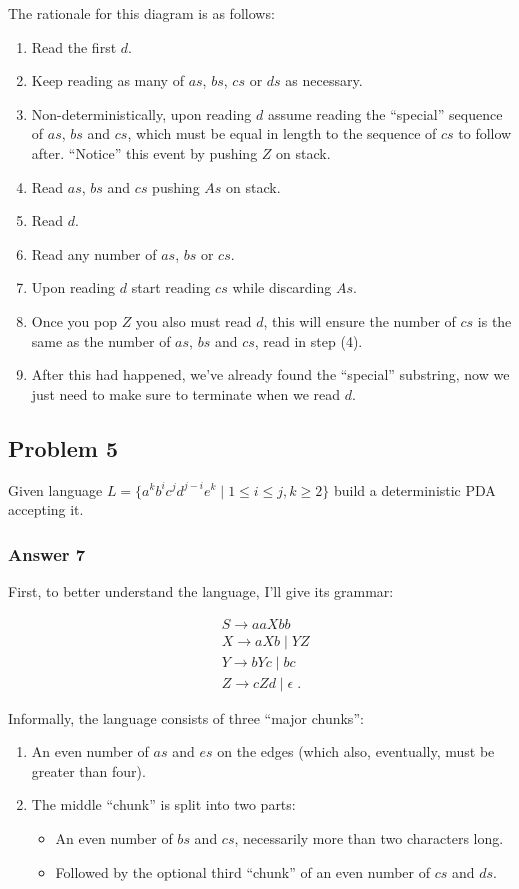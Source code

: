 \documentclass[11pt]{article}
\begin{document}
The rationale for this diagram is as follows:
\begin{enumerate}
\item Read the first $d$.
\item Keep reading as many of $as$, $bs$, $cs$ or $ds$ as necessary.
\item Non-deterministically, upon reading $d$ assume reading the
``special'' sequence of $as$, $bs$ and $cs$, which must be equal
in length to the sequence of $cs$ to follow after.
``Notice'' this event by pushing $Z$ on stack.
\item Read $as$, $bs$ and $cs$ pushing $As$ on stack.
\item Read $d$.
\item Read any number of $as$, $bs$ or $cs$.
\item Upon reading $d$ start reading $cs$ while discarding $As$.
\item Once you pop $Z$ you also must read $d$, this will ensure the number of
$cs$ is the same as the number of $as$, $bs$ and $cs$, read in step (4).
\item After this had happened, we've already found the ``special'' substring,
now we just need to make sure to terminate when we read $d$.
\end{enumerate}

\subsection{Problem 5}
\label{sec-1-5}
Given language $L=\{a^kb^ic^jd^{j-i}e^k \;|\; 1 \leq i \leq j, k \geq 2 \}$
build a deterministic PDA accepting it.

\subsubsection{Answer 7}
\label{sec-1-5-1}
First, to better understand the language, I'll give its grammar:

\begin{align*}
  &S \to aaXbb \\
  &X \to aXb \;|\; YZ \\
  &Y \to bYc \;|\; bc \\
  &Z \to cZd \;|\; \epsilon \;.
\end{align*}

Informally, the language consists of three ``major chunks'':
\begin{enumerate}
\item An even number of $as$ and $es$ on the edges (which also, eventually,
must be greater than four).
\item The middle ``chunk'' is split into two parts:
\begin{itemize}
\item An even number of $bs$ and $cs$, necessarily more than two characters
long.
\item Followed by the optional third ``chunk'' of an even number of $cs$ and
$ds$.
\end{itemize}
\end{enumerate}
\end{document}
